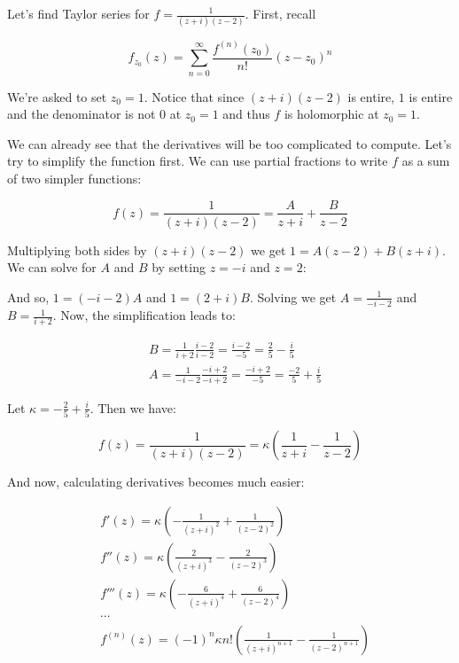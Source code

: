 Let's find Taylor series for $f =
	\frac{1}{(z+i)(z-2)}$. First, recall

\begin{equation}\label{eq:taylor}
	f_{z_0}(z) = \sum_{n=0}^{\infty}
	\frac{f^{(n)}(z_0)}{n!} (z-z_0)^n
\end{equation}

We're asked to set $z_0 = 1$. Notice that since
$(z+i)(z-2)$ is entire, $1$ is entire and the
denominator is not 0 at $z_0 = 1$
and thus $f$ is holomorphic at $z_0 = 1$.

We can already see that the derivatives will be too
complicated to compute. Let's try to simplify the
function first. We can use
partial fractions to write $f$ as a sum of two
simpler functions:

\begin{equation}
	f(z) = \frac{1}{(z+i)(z-2)} = \frac{A}{z+i}
	+ \frac{B}{z-2}
\end{equation}

Multiplying both sides by $(z+i)(z-2)$
we get $1 = A(z-2) + B(z+i)$. We can solve for $A$
and $B$ by setting $z = -i$
and $z = 2$:

And so, $1 = (-i-2)A$ and $1 = (2+i)B$. Solving we get $A = \frac{1}{-i-2}$
and $B = \frac{1}{i+2}$. Now, the simplification leads to:

\begin{align*}
	 & B = \frac{1}{i+2}\frac{i-2}{i-2} = \frac{i-2}{-5} = \frac{2}{5} - \frac{i}{5}      \\
	 & A = \frac{1}{-i-2}\frac{-i+2}{-i+2} = \frac{-i+2}{-5} = \frac{-2}{5} + \frac{i}{5}
\end{align*}

Let $\kappa = -\frac{2}{5} + \frac{i}{5}$. Then we have:

\begin{equation}
	f(z) = \frac{1}{(z+i)(z-2)} = \kappa\left(\frac{1}{z+i} - \frac{1}{z-2}\right)
\end{equation}

And now, calculating derivatives becomes much easier:

\begin{align*}
	 & f'(z)   = \kappa\left(-\frac{1}{(z+i)^2} + \frac{1}{(z-2)^2}\right)                        \\
	 & f''(z)  = \kappa\left(\frac{2}{(z+i)^3} - \frac{2}{(z-2)^3}\right)                         \\
	 & f'''(z) = \kappa\left(-\frac{6}{(z+i)^4} + \frac{6}{(z-2)^4}\right)                        \\
	 & \cdots                                                                                     \\
	 & f^{(n)}(z) = (-1)^{n} \kappa n! \left(\frac{1}{(z+i)^{n+1}} - \frac{1}{(z-2)^{n+1}}\right)
\end{align*}

